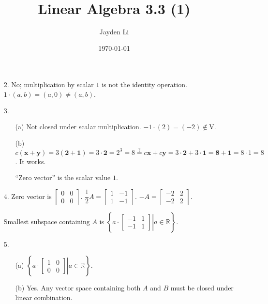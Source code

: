 \documentclass{article}
\title{\vspace*{-30pt}Linear Algebra 3.3 (1)}
\author{Jayden Li}
\date{\today}
\begin{document}
\fontsize{12pt}{12pt}\selectfont
\setlength{\abovedisplayskip}{0pt}
\maketitle
\begin{enumerate}
	\item[2.] No; multiplication by scalar $1$ is not the identity operation. $1\cdot(a,b)=(a,0)\neq(a,b)$.
	\item[3.] \begin{itemize}
		\item[(a)] Not closed under scalar multiplication. $-1\cdot(2)=(-2)\not\in\mathrm V$.
		\item[(b)]
			$c(\mathbf x+\mathbf y)=3(\mathbf 2+\mathbf 1)=3\cdot\mathbf2=2^3=8\overset?=c\mathbf x+c\mathbf y=3\cdot\mathbf 2+3\cdot\mathbf 1=\mathbf8+\mathbf1=8\cdot1=8$. It works.

			``Zero vector'' is the scalar value $1$.
	\end{itemize}
	\item[4.]
		Zero vector is $\begin{bmatrix}
			0 & 0 \\
			0 & 0
		\end{bmatrix}$.
		$\dfrac12A=\begin{bmatrix}
			1 & -1 \\
			1 & -1
		\end{bmatrix}$.
		$-A=\begin{bmatrix}
			-2 & 2 \\
			-2 & 2
		\end{bmatrix}$.

		Smallest subspace containing $A$ is
		$\left\{\left.a\cdot\begin{bmatrix}
			-1 & 1 \\
			-1 & 1
		\end{bmatrix}\right|a\in\mathbb R\right\}$.
	\item[5.]
		\begin{itemize}
			\item[(a)]
				$\left\{\left.a\cdot\begin{bmatrix}
					1 & 0 \\
					0 & 0
				\end{bmatrix}\right|a\in\mathbb R\right\}$.

			\item[(b)]
				Yes. Any vector space containing both $A$ and $B$ must be closed under linear combination.


\end{itemize}
\end{enumerate}
\end{document}
